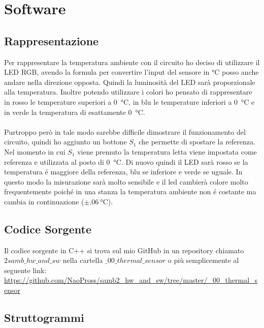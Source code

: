 \documentclass[a4paper]{article}
\begin{document}
	\section{Software}
	\subsection{Rappresentazione}
	Per rappresentare la temperatura ambiente con il circuito ho deciso di utilizzare il LED RGB,
	avendo la formula per convertire l'input del sensore in \si{\celsius} posso anche andare nella
	direzione opposta. Quindi la luminosità del LED sarà proporzionale alla temperatura.
	Inoltre potendo utilizzare i colori ho pensato di rappresentare in rosso le temperature 
	superiori a \SI{0}{\celsius}, in blu le temperature inferiori a \SI{0}{\celsius} e in verde la
	temperatura di esattamente \SI{0}{\celsius}.\\\\
	Purtroppo però in tale modo sarebbe difficile dimostrare il funzionamento del circuito, quindi
	ho aggiunto un bottone $S_1$ che permette di spostare la referenza. Nel momento in cui $S_1$ 
	viene premuto la temperatura letta viene impostata come referenza e utilizzata al posto di
	\SI{0}{\celsius}. Di nuovo quindi il LED sarà rosso se la temperatura é maggiore della 
	referenza, blu se inferiore e verde se uguale. In questo modo la misurazione sarà molto
	sensibile e il led cambierà colore molto frequentemente poiché in una stanza la temperatura
	ambiente non é costante ma cambia in continuazione ($\pm\SI{.06}{\celsius}$).
	
	\subsection{Codice Sorgente}
	Il codice sorgente in C++ si trova sul mio GitHub in un repository
	chiamato $2samb\_hw\_and\_sw$ nella cartella $\_00\_thermal\_sensor$ o più semplicemente
	al seguente link: \\
	\url{https://github.com/NaoPross/samb2_hw_and_sw/tree/master/_00_thermal_sensor}

	\subsection{Struttogrammi}
	
\end{document}
